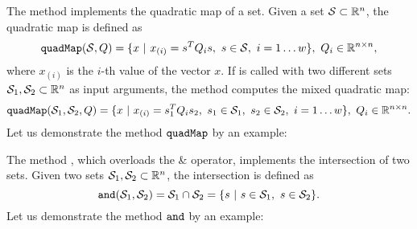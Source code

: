 \label{sec:quadMap}

The method  implements the quadratic map of a set. Given a set $\mathcal{S} \subset \mathbb{R}^n$, the quadratic map is defined as 
\begin{equation*}
	{\normalfont \texttt{quadMap}}(\mathcal{S},Q) = \{ x ~|~ x_{(i)} = s^T Q_i s, ~s \in \mathcal{S},~ i = 1 \dots w \}, ~ Q_i \in \mathbb{R}^{n \times n},
\end{equation*}
where $x_{(i)}$ is the $i$-th value of the vector $x$. If  is called with two different sets $\mathcal{S}_1,\mathcal{S}_2 \subset \mathbb{R}^n$ as input arguments, the method computes the mixed quadratic map:
\begin{equation*}
	{\normalfont \texttt{quadMap}}(\mathcal{S}_1,\mathcal{S}_2,Q) = \{ x ~|~ x_{(i)} = s_1^T Q_i s_2, ~s_1 \in \mathcal{S}_1,~s_2 \in \mathcal{S}_2,~ i = 1 \dots w \}, ~ Q_i \in \mathbb{R}^{n \times n}.
\end{equation*}
Let us demonstrate the method ${\normalfont \texttt{quadMap}}$ by an example:

\begin{center}
\begin{minipage}[t]{0.35\textwidth}
	\vspace{10pt}
	\footnotesize
	
\end{minipage}
\begin{minipage}[t]{0.6\textwidth}
	\vspace{0pt}
	\centering
\end{minipage}
\end{center}

\vspace{1cm}

\label{sec:and}

The method , which overloads the \& operator, implements the intersection of two sets. Given two sets $\mathcal{S}_1,\mathcal{S}_2 \subset \mathbb{R}^n$, the intersection is defined as 
\begin{equation*}
	{\normalfont \texttt{and}}(\mathcal{S}_1,\mathcal{S}_2) = \mathcal{S}_1 \cap \mathcal{S}_2 = \{ s ~|~ s \in \mathcal{S}_1,~ s \in \mathcal{S}_2 \}.
\end{equation*}
Let us demonstrate the method ${\normalfont \texttt{and}}$ by an example:

\begin{center}
\begin{minipage}[t]{0.35\textwidth}
	\vspace{10pt}
	\footnotesize
	
\end{minipage}
\begin{minipage}[t]{0.6\textwidth}
	\vspace{0pt}
	\centering
\end{minipage}
\end{center}


